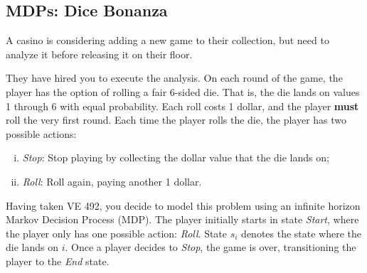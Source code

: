 \documentclass[11pt, answers]{exam}
\begin{document}
\newpage

%
%
\begin{questions}
\section{MDPs: Dice Bonanza}
\question
A casino is considering adding a new game to their collection, but need to analyze it before releasing it on their floor. 

They have hired you to execute the analysis. On each round of the game, the player has the option of rolling a fair 6-sided die. That is, the die lands on values 1 through 6 with equal probability. Each roll costs 1 dollar, and the player \textbf{must} roll the very first round. Each time the player rolls the die, the player has two possible actions:
\begin{enumerate}[i.]
\item \textit{Stop}: Stop playing by collecting the dollar value that the die lands on;
\item \textit{Roll}: Roll again, paying another 1 dollar.
\end{enumerate}

Having taken VE 492, you decide to model this problem using an infinite horizon Markov Decision Process (MDP). The player initially starts in state \textit{Start}, where the player only has one possible action: \textit{Roll}. State $s_i$ denotes the state where the die lands on $i$. Once a player decides to \textit{Stop}, the game is over, transitioning the player to the \textit{End} state.

\end{questions}
\end{document}
